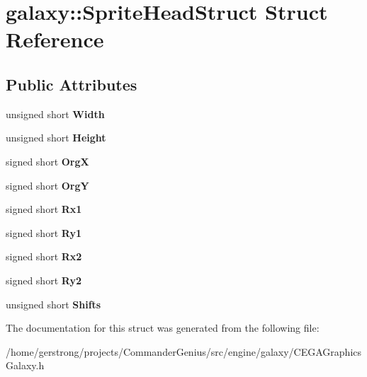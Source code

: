 \hypertarget{structgalaxy_1_1_sprite_head_struct}{
\section{galaxy::SpriteHeadStruct Struct Reference}
\label{structgalaxy_1_1_sprite_head_struct}
}
\subsection*{Public Attributes}
\begin{DoxyCompactItemize}
\item 
\hypertarget{structgalaxy_1_1_sprite_head_struct_ae9a15eab1cf1c67e08ffd75c6d87f216}{
unsigned short {\bfseries Width}}
\label{structgalaxy_1_1_sprite_head_struct_ae9a15eab1cf1c67e08ffd75c6d87f216}

\item 
\hypertarget{structgalaxy_1_1_sprite_head_struct_a8563db9532799552a18a822e08e3541a}{
unsigned short {\bfseries Height}}
\label{structgalaxy_1_1_sprite_head_struct_a8563db9532799552a18a822e08e3541a}

\item 
\hypertarget{structgalaxy_1_1_sprite_head_struct_a0cde92807c30a3d1e50685aa204e0680}{
signed short {\bfseries OrgX}}
\label{structgalaxy_1_1_sprite_head_struct_a0cde92807c30a3d1e50685aa204e0680}

\item 
\hypertarget{structgalaxy_1_1_sprite_head_struct_aef8079e896e721c8fbc3adf2ddfc6f47}{
signed short {\bfseries OrgY}}
\label{structgalaxy_1_1_sprite_head_struct_aef8079e896e721c8fbc3adf2ddfc6f47}

\item 
\hypertarget{structgalaxy_1_1_sprite_head_struct_a54219f55e167ae8ec7858995329d4bb4}{
signed short {\bfseries Rx1}}
\label{structgalaxy_1_1_sprite_head_struct_a54219f55e167ae8ec7858995329d4bb4}

\item 
\hypertarget{structgalaxy_1_1_sprite_head_struct_a8f48e3a5ddae3a441b9bc345ea26a1d6}{
signed short {\bfseries Ry1}}
\label{structgalaxy_1_1_sprite_head_struct_a8f48e3a5ddae3a441b9bc345ea26a1d6}

\item 
\hypertarget{structgalaxy_1_1_sprite_head_struct_af68944d12fc0717b5c21b95fda7221ad}{
signed short {\bfseries Rx2}}
\label{structgalaxy_1_1_sprite_head_struct_af68944d12fc0717b5c21b95fda7221ad}

\item 
\hypertarget{structgalaxy_1_1_sprite_head_struct_ae64fa4a36d04a60583764870900023c9}{
signed short {\bfseries Ry2}}
\label{structgalaxy_1_1_sprite_head_struct_ae64fa4a36d04a60583764870900023c9}

\item 
\hypertarget{structgalaxy_1_1_sprite_head_struct_a34d5871ba5c1b76919e28708b4ceecd9}{
unsigned short {\bfseries Shifts}}
\label{structgalaxy_1_1_sprite_head_struct_a34d5871ba5c1b76919e28708b4ceecd9}

\end{DoxyCompactItemize}


The documentation for this struct was generated from the following file:\begin{DoxyCompactItemize}
\item 
/home/gerstrong/projects/CommanderGenius/src/engine/galaxy/CEGAGraphicsGalaxy.h\end{DoxyCompactItemize}
